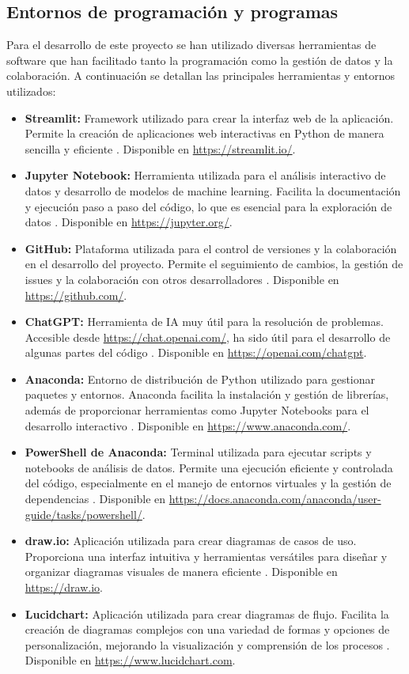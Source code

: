 \subsection{Entornos de programación y programas}

Para el desarrollo de este proyecto se han utilizado diversas herramientas de software que han facilitado tanto la programación como la gestión de datos y la colaboración. A continuación se detallan las principales herramientas y entornos utilizados:

\begin{itemize}
    \item \textbf{Streamlit:} Framework utilizado para crear la interfaz web de la aplicación. Permite la creación de aplicaciones web interactivas en Python de manera sencilla y eficiente \cite{Streamlit}. Disponible en \url{https://streamlit.io/}.
    \item \textbf{Jupyter Notebook:} Herramienta utilizada para el análisis interactivo de datos y desarrollo de modelos de machine learning. Facilita la documentación y ejecución paso a paso del código, lo que es esencial para la exploración de datos \cite{Jupyter}. Disponible en \url{https://jupyter.org/}.
    \item \textbf{GitHub:} Plataforma utilizada para el control de versiones y la colaboración en el desarrollo del proyecto. Permite el seguimiento de cambios, la gestión de issues y la colaboración con otros desarrolladores \cite{GitHub}. Disponible en \url{https://github.com/}.
    \item \textbf{ChatGPT:} Herramienta de IA muy útil para la resolución de problemas. Accesible desde \url{https://chat.openai.com/}, ha sido útil para el desarrollo de algunas partes del código \cite{ChatGPT}. Disponible en \url{https://openai.com/chatgpt}.
    \item \textbf{Anaconda:} Entorno de distribución de Python utilizado para gestionar paquetes y entornos. Anaconda facilita la instalación y gestión de librerías, además de proporcionar herramientas como Jupyter Notebooks para el desarrollo interactivo \cite{Anaconda}. Disponible en \url{https://www.anaconda.com/}.
    \item \textbf{PowerShell de Anaconda:} Terminal utilizada para ejecutar scripts y notebooks de análisis de datos. Permite una ejecución eficiente y controlada del código, especialmente en el manejo de entornos virtuales y la gestión de dependencias \cite{PowerShell}. Disponible en \url{https://docs.anaconda.com/anaconda/user-guide/tasks/powershell/}.
    \item \textbf{draw.io:} Aplicación utilizada para crear diagramas de casos de uso. Proporciona una interfaz intuitiva y herramientas versátiles para diseñar y organizar diagramas visuales de manera eficiente \cite{drawio}. Disponible en \url{https://draw.io}.
    \item \textbf{Lucidchart:} Aplicación utilizada para crear diagramas de flujo. Facilita la creación de diagramas complejos con una variedad de formas y opciones de personalización, mejorando la visualización y comprensión de los procesos \cite{Lucidchart}. Disponible en \url{https://www.lucidchart.com}.
\end{itemize}

